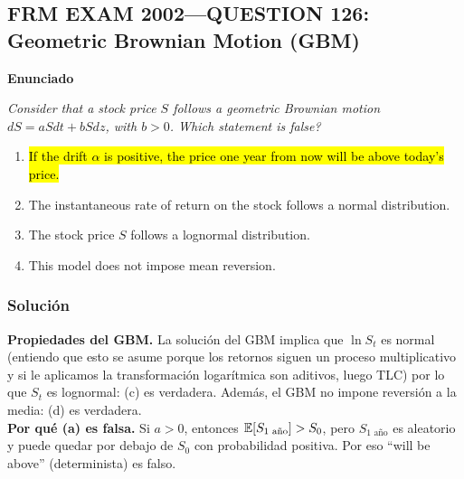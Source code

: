 ﻿\subsection{FRM EXAM 2002---QUESTION 126: Geometric Brownian Motion (GBM)}

\textbf{Enunciado}

\emph{Consider that a stock price \(S\) follows a geometric Brownian motion \(dS=aSdt+bSdz\), with \(b>0\). Which statement is false?}
\begin{enumerate}[label=\alph*.]
\item \hl{If the drift $\alpha$ is positive, the price one year from now will be above today’s price.} 
\item The instantaneous rate of return on the stock follows a normal distribution.
\item The stock price \(S\) follows a lognormal distribution.
\item This model does not impose mean reversion.
\end{enumerate}

\subsubsection*{Solución}


\textbf{Propiedades del GBM. }La solución del GBM implica que \(\ln S_t\) es normal (entiendo que esto se asume porque los retornos siguen un proceso multiplicativo y si le aplicamos la transformación logarítmica son aditivos, luego TLC) por lo que \(S_t\) es lognormal: (c) es verdadera. Además, el GBM no impone reversión a la media: (d) es verdadera.\\

\textbf{Por qué (a) es falsa. }Si \(a>0\), entonces \(\mathbb{E}[S_{1\text{ año}}]>S_0\), pero \(S_{1\text{ año}}\) es aleatorio y puede quedar por debajo de \(S_0\) con probabilidad positiva. Por eso ``will be above'' (determinista) es falso.











